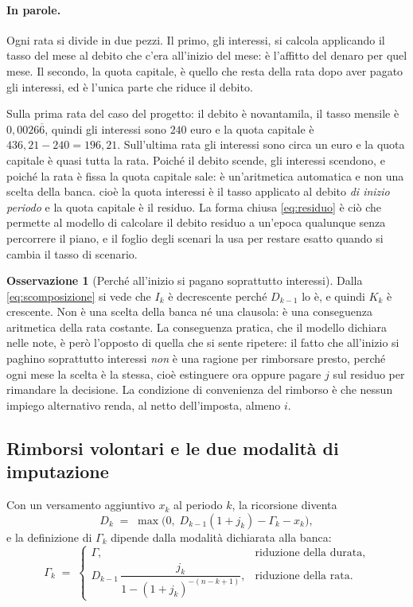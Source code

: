 \documentclass[11pt,a4paper]{article}
\theoremstyle{definition}
\newtheorem{osservazione}[definizione]{Osservazione}
\theoremstyle{plain}
\begin{document}
\paragraph{In parole.} Ogni rata si divide in due pezzi. Il primo, gli interessi, si calcola applicando il tasso del mese al debito che c'era all'inizio del mese: è l'affitto del denaro per quel mese. Il secondo, la quota capitale, è quello che resta della rata dopo aver pagato gli interessi, ed è l'unica parte che riduce il debito.

Sulla prima rata del caso del progetto: il debito è novantamila, il tasso mensile è $0{,}0026\overline{6}$, quindi gli interessi sono $240$ euro e la quota capitale è $436{,}21 - 240 = 196{,}21$. Sull'ultima rata gli interessi sono circa un euro e la quota capitale è quasi tutta la rata. Poiché il debito scende, gli interessi scendono, e poiché la rata è fissa la quota capitale sale: è un'aritmetica automatica e non una scelta della banca.
cioè la quota interessi è il tasso applicato al debito \emph{di inizio periodo} e la quota capitale è il residuo. La forma chiusa \eqref{eq:residuo} è ciò che permette al modello di calcolare il debito residuo a un'epoca qualunque senza percorrere il piano, e il foglio degli scenari la usa per restare esatto quando si cambia il tasso di scenario.

\begin{osservazione}[Perché all'inizio si pagano soprattutto interessi]
Dalla \eqref{eq:scomposizione} si vede che $I_k$ è decrescente perché $D_{k-1}$ lo è, e quindi $K_k$ è crescente. Non è una scelta della banca né una clausola: è una conseguenza aritmetica della rata costante. La conseguenza pratica, che il modello dichiara nelle note, è però l'opposto di quella che si sente ripetere: il fatto che all'inizio si paghino soprattutto interessi \emph{non} è una ragione per rimborsare presto, perché ogni mese la scelta è la stessa, cioè estinguere ora oppure pagare $j$ sul residuo per rimandare la decisione. La condizione di convenienza del rimborso è che nessun impiego alternativo renda, al netto dell'imposta, almeno $i$.
\end{osservazione}

\subsection{Rimborsi volontari e le due modalità di imputazione}

Con un versamento aggiuntivo $x_k$ al periodo $k$, la ricorsione diventa
\begin{equation}
D_k \;=\; \max\big(0,\; D_{k-1}(1+j_k) - \Gamma_k - x_k\big),
\label{eq:ricorsione}
\end{equation}
e la definizione di $\Gamma_k$ dipende dalla modalità dichiarata alla banca:
\begin{equation}
\Gamma_k \;=\;
\begin{cases}
\Gamma, & \text{riduzione della durata,}\\[0.4em]
D_{k-1}\,\dfrac{j_k}{1-(1+j_k)^{-(n-k+1)}}, & \text{riduzione della rata.}
\end{cases}
\label{eq:modalità}
\end{equation}
\end{document}
